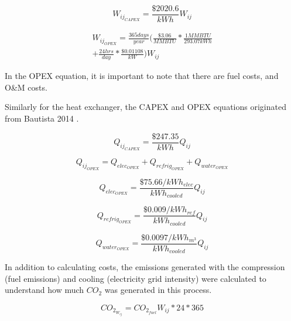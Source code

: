 \documentclass[balance,upint,subscriptcorrection,varvw,mathalfa=cal=boondoxo,spanish,french,vietnamese,russian,greek,pdf-a,colorlinks]{asmeconf}
\begin{document}
\begin{equation}
    W_{ij_{CAPEX}} = \frac{\$2020.6}{kWh}W_{ij}
\end{equation}

\begin{equation}
    \begin{array}{l}
        W_{ij_{OPEX}} = \frac{365 days}{year}\bigg(\frac{\$3.06}{MMBTU}*\frac{1 MMBTU}{293.07 kWh} \\
        + \frac{24 hrs}{day}*\frac{\$0.01108}{kW}\bigg)W_{ij}
    \end{array}
\end{equation}

In the OPEX equation, it is important to note that there are fuel costs, and O\&M costs. 

Similarly for the heat exchanger, the CAPEX and OPEX equations originated from Bautista 2014 \cite{bautista}. 

\begin{equation}
    Q_{ij_{CAPEX}} = \frac{\$247.35}{kWh}Q_{ij}
\end{equation}

\begin{equation}
    Q_{ij_{OPEX}} = Q_{{elec}_{OPEX}} + Q_{{refrig}_{OPEX}} + Q_{{water}_{OPEX}}
\end{equation}

\begin{equation}
    Q_{{elec}_{OPEX}} = \frac{\$75.66/kWh_{elec}}{kWh_{cooled}}Q_{ij}
\end{equation}

\begin{equation}
    Q_{{refrig}_{OPEX}} = \frac{\$0.009/kWh_{ref}}{kWh_{cooled}}Q_{ij}
\end{equation}

\begin{equation}
    Q_{{water}_{OPEX}} = \frac{\$0.0097/kWh_{m^3}}{kWh_{cooled}}Q_{ij}
\end{equation}

In addition to calculating costs, the emissions generated with the compression (fuel emissions) and cooling (electricity grid intensity) were calculated to understand how much \begin{math}{CO_2} \end{math} was generated in this process.

\begin{equation}
    CO_{2_{W_{ij}}} = CO_{2_{fuel}}W_{ij}*24*365
\end{equation}
\end{document}
